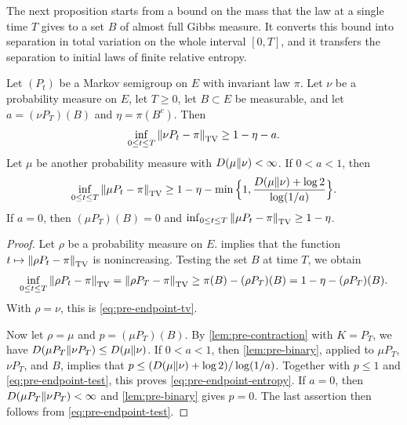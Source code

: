 The next proposition starts from a bound on the mass that the law at a single time $T$ gives to a set $B$ of almost full Gibbs measure. It converts this bound into separation in total variation on the whole interval $[0,T]$, and it transfers the separation to initial laws of finite relative entropy.

\begin{proposition}\label{prop:pre-endpoint}
Let $(P_t)$ be a Markov semigroup on $E$ with invariant law $\pi$. Let $\nu$ be a probability measure on $E$, let $T\ge0$, let $B\subset E$ be measurable, and let $a=(\nu P_T)(B)$ and $\eta=\pi(B^c)$. Then
\begin{equation}\label{eq:pre-endpoint-tv}
\inf_{0\le t\le T}\left\lVert\nu P_t-\pi\right\rVert_{\mathrm{TV}}\ge1-\eta-a.
\end{equation}
Let $\mu$ be another probability measure with $D(\mu\|\nu)<\infty$. If $0<a<1$, then
\begin{equation}\label{eq:pre-endpoint-entropy}
\inf_{0\le t\le T}\left\lVert\mu P_t-\pi\right\rVert_{\mathrm{TV}}\ge1-\eta-\min\Big\{1,\frac{D(\mu\|\nu)+\log2}{\log(1/a)}\Big\}.
\end{equation}
If $a=0$, then $(\mu P_T)(B)=0$ and $\inf_{0\le t\le T}\left\lVert\mu P_t-\pi\right\rVert_{\mathrm{TV}}\ge1-\eta$.
\end{proposition}

\begin{proof}
Let $\rho$ be a probability measure on $E$.  implies that the function $t\mapsto\left\lVert\rho P_t-\pi\right\rVert_{\mathrm{TV}}$ is nonincreasing. Testing the set $B$ at time $T$, we obtain
\begin{equation}\label{eq:pre-endpoint-test}
\inf_{0\le t\le T}\left\lVert\rho P_t-\pi\right\rVert_{\mathrm{TV}}=\left\lVert\rho P_T-\pi\right\rVert_{\mathrm{TV}}\ge\pi(B)-(\rho P_T)(B)=1-\eta-(\rho P_T)(B).
\end{equation}
With $\rho=\nu$, this is \eqref{eq:pre-endpoint-tv}.

Now let $\rho=\mu$ and $p=(\mu P_T)(B)$. By \cref{lem:pre-contraction} with $K=P_T$, we have $D(\mu P_T\|\nu P_T)\le D(\mu\|\nu)$. If $0<a<1$, then \cref{lem:pre-binary}, applied to $\mu P_T$, $\nu P_T$, and $B$, implies that $p\le(D(\mu\|\nu)+\log2)/\log(1/a)$. Together with $p\le1$ and \eqref{eq:pre-endpoint-test}, this proves \eqref{eq:pre-endpoint-entropy}. If $a=0$, then $D(\mu P_T\|\nu P_T)<\infty$ and \cref{lem:pre-binary} gives $p=0$. The last assertion then follows from \eqref{eq:pre-endpoint-test}.
\end{proof}

